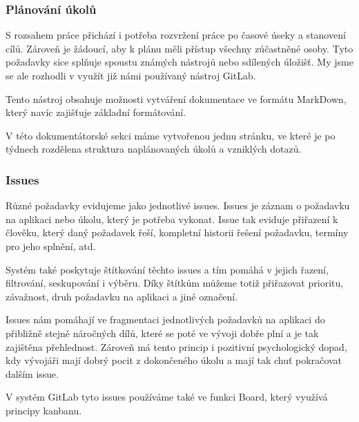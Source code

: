 \documentclass[czech,BP]{thesiskiv}
\begin{document}
\subsubsection{Plánování úkolů}
\par S rozsahem práce přichází i potřeba rozvržení práce po časové úseky a stanovení cílů. Zároveň je žádoucí, aby k plánu měli přístup všechny zúčastněné osoby. Tyto požadavky sice splňuje spoustu známých nástrojů nebo sdílených úložišť. My jsme se ale rozhodli v využít již námi používaný nástroj GitLab.
\par Tento nástroj obsahuje možnosti vytváření dokumentace ve formátu MarkDown, který navíc zajišťuje základní formátování.
\par V této dokumentátorské sekci máme vytvořenou jednu stránku, ve které je po týdnech rozdělena struktura naplánovaných úkolů a vzniklých dotazů.
\subsubsection{Issues}
\par Různé požadavky evidujeme jako jednotlivé issues. Issues je záznam o požadavku na aplikaci nebo úkolu, který je potřeba vykonat. Issue tak eviduje přiřazení k člověku, který daný požadavek řeší, kompletní historii řešení požadavku, termíny pro jeho splnění, atd.
\par Systém také poskytuje štítkování těchto issues a tím pomáhá v jejich řazení, filtrování, seskupování i výběru. Díky štítkům můžeme totiž přiřazovat prioritu, závažnost, druh požadavku na aplikaci a jiné označení.
\par Issues nám pomáhají ve fragmentaci  jednotlivých požadavků na aplikaci do přibližně stejně náročných dílů, které se poté ve vývoji dobře plní a je tak zajištěna přehlednost. Zároveň má tento princip i pozitivní psychologický dopad, kdy vývojáři mají dobrý pocit z dokončeného úkolu a mají tak chuť pokračovat dalším issue.
\par V systém GitLab tyto issues používáme také ve funkci Board, který využívá principy kanbanu.
\end{document}
